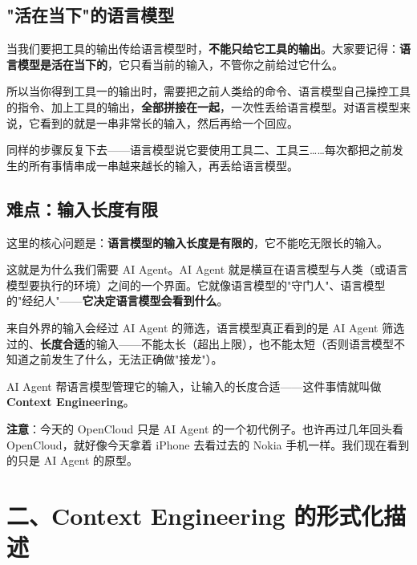 \documentclass[12pt,a4paper]{article}
\begin{document}
\subsection{"活在当下"的语言模型}

当我们要把工具的输出传给语言模型时，\textbf{不能只给它工具的输出}。大家要记得：\textbf{语言模型是活在当下的}，它只看当前的输入，不管你之前给过它什么。

所以当你得到工具一的输出时，需要把之前人类给的命令、语言模型自己操控工具的指令、加上工具的输出，\textbf{全部拼接在一起}，一次性丢给语言模型。对语言模型来说，它看到的就是一串非常长的输入，然后再给一个回应。

同样的步骤反复下去——语言模型说它要使用工具二、工具三……每次都把之前发生的所有事情串成一串越来越长的输入，再丢给语言模型。

\subsection{难点：输入长度有限}

这里的核心问题是：\textbf{语言模型的输入长度是有限的}，它不能吃无限长的输入。

这就是为什么我们需要 AI Agent。AI Agent 就是横亘在语言模型与人类（或语言模型要执行的环境）之间的一个界面。它就像语言模型的"守门人"、语言模型的"经纪人"——\textbf{它决定语言模型会看到什么}。

来自外界的输入会经过 AI Agent 的筛选，语言模型真正看到的是 AI Agent 筛选过的、\textbf{长度合适}的输入——不能太长（超出上限），也不能太短（否则语言模型不知道之前发生了什么，无法正确做"接龙"）。

\begin{myquote}
AI Agent 帮语言模型管理它的输入，让输入的长度合适——这件事情就叫做 \textbf{Context Engineering}。
\end{myquote}

\begin{myquote}
\textbf{注意}：今天的 OpenCloud 只是 AI Agent 的一个初代例子。也许再过几年回头看 OpenCloud，就好像今天拿着 iPhone 去看过去的 Nokia 手机一样。我们现在看到的只是 AI Agent 的原型。
\end{myquote}

\section{二、Context Engineering 的形式化描述}
\end{document}
